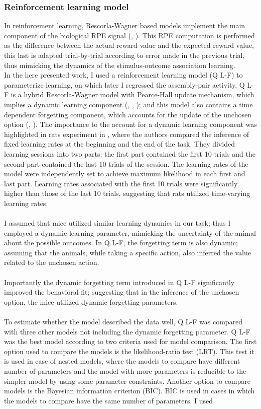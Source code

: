 \subsubsection{Reinforcement learning model}
In reinforcement learning, Rescorla-Wagner based models implement the main component of the biological RPE signal (\cite{Montague}, \cite{Schultz2016}). This RPE computation is performed as the difference between the actual reward value and the expected reward value, this last is adapted trial-by-trial according to error made in the previous trial, thus mimicking the dynamics of the stimulus-outcome association learning.\\In the here presented work, I used a reinforcement learning model (Q L-F) to parameterize learning, on which later I regressed the assembly-pair activity. Q L-F is a hybrid Rescorla-Wagner model with Pearce-Hall update mechanism, which implies a dynamic learning component (\cite{Koppe}, \cite{Li}, \cite{Costa}); and this model also contains a time dependent forgetting component, which accounts for the update of the unchosen option (\cite{ItoDoya1}, \cite{Katahira}). The importance to the account for a dynamic learning component was highlighted in rats experiment in  , where the authors compared the inference of fixed learning rates at the beginning and the end of the task. They divided learning sessions into two parts: the first part contained the first 10 trials and the second part contained the last 10 trials of the session. The learning rates of the model were independently set to achieve maximum likelihood in each first and last part. Learning rates associated with the first 10 trials were significantly higher than those of the last 10 trials, suggesting that rats utilized time-varying learning rates.\\\\I assumed that mice utilized similar learning dynamics in our task; thus I employed a dynamic learning parameter, mimicking the uncertainty of the animal about the possible outcomes. In Q L-F, the forgetting term is also dynamic; assuming that the animals, while taking a specific action, also inferred the value related to the unchosen action.\\\\Importantly the dynamic forgetting term introduced in Q L-F significantly improved the behavioral fit; suggesting that in the inference of the unchosen option, the mice utilized dynamic forgetting parameters.\\\\To estimate whether the model described the data well, Q L-F was compared with three other models not including the dynamic forgetting parameter. Q L-F was the best model according to two criteria used for model comparison. The first option used to compare the models is the likelihood-ratio test (LRT). This test it is used in case of nested models, where the models to compare have different number of parameters and the model with more parameters is reducible to the simpler model by using some parameter constraints. Another option to compare models is the Bayesian information criterion (BIC). BIC is used in cases in which the models to compare have the same number of parameters. I used 